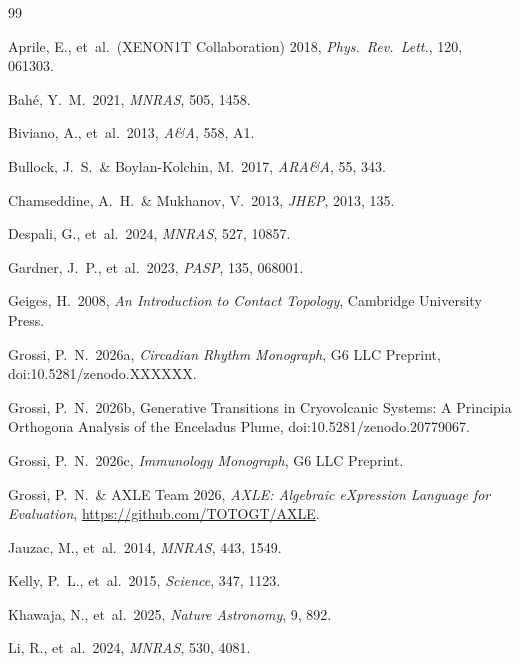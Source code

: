 \documentclass[11pt,a4paper,openright]{book}
\theoremstyle{dm3thm}
\theoremstyle{dm3def}
\begin{document}
\begin{thebibliography}{99}

Aprile, E., et~al.\ (XENON1T Collaboration) 2018, \textit{Phys.\ Rev.\ Lett.},
120, 061303.

Bahé, Y.~M.\ 2021, \textit{MNRAS}, 505, 1458.

Biviano, A., et~al.\ 2013, \textit{A\&A}, 558, A1.

Bullock, J.~S.\ \& Boylan-Kolchin, M.\ 2017, \textit{ARA\&A}, 55, 343.

Chamseddine, A.~H.\ \& Mukhanov, V.\ 2013, \textit{JHEP}, 2013, 135.

Despali, G., et~al.\ 2024, \textit{MNRAS}, 527, 10857.

Gardner, J.~P., et~al.\ 2023, \textit{PASP}, 135, 068001.

Geiges, H.\ 2008, \textit{An Introduction to Contact Topology},
Cambridge University Press.

Grossi, P.~N.\ 2026a, \textit{Circadian Rhythm Monograph}, G6 LLC Preprint,
doi:10.5281/zenodo.XXXXXX.

Grossi, P.~N.\ 2026b, Generative Transitions in Cryovolcanic Systems: A
Principia Orthogona Analysis of the Enceladus Plume,
doi:10.5281/zenodo.20779067.

Grossi, P.~N.\ 2026c, \textit{Immunology Monograph}, G6 LLC Preprint.

Grossi, P.~N.\ \& AXLE Team 2026,
\textit{AXLE: Algebraic eXpression Language for Evaluation},
\url{https://github.com/TOTOGT/AXLE}.

Jauzac, M., et~al.\ 2014, \textit{MNRAS}, 443, 1549.

Kelly, P.~L., et~al.\ 2015, \textit{Science}, 347, 1123.

Khawaja, N., et~al.\ 2025, \textit{Nature Astronomy}, 9, 892.

Li, R., et~al.\ 2024, \textit{MNRAS}, 530, 4081.


\end{thebibliography}
\end{document}

